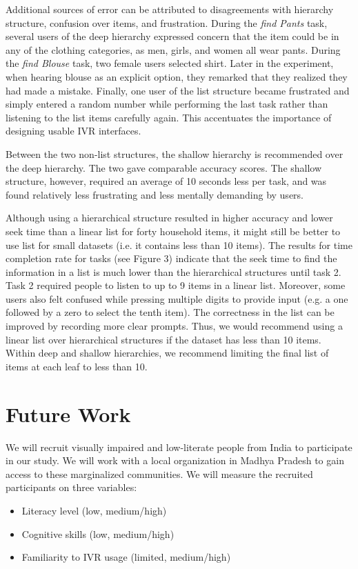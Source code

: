 \documentclass{sigchi}
\begin{document}
Additional sources of error can be attributed to disagreements with hierarchy structure, confusion over items, and frustration. During the \textit{find Pants} task, several users of the deep hierarchy expressed concern that the item could be in any of the clothing categories, as men, girls, and women all wear pants. During the \textit{find Blouse} task, two female users selected shirt. Later in the experiment, when hearing blouse as an explicit option, they remarked that they realized they had made a mistake. Finally, one user of the list structure became frustrated and simply entered a random number while performing the last task rather than listening to the list items carefully again. This accentuates the importance of designing usable IVR interfaces. 

Between the two non-list structures, the shallow hierarchy is recommended over the deep hierarchy. The two gave comparable accuracy scores. The shallow structure, however, required an average of 10 seconds less per task, and was found relatively less frustrating and less mentally demanding by users.

Although using a hierarchical structure resulted in higher accuracy and lower seek time than a linear list for forty household items, it might still be better to use list for small datasets (i.e. it contains less than 10 items). The results for time completion rate for tasks (see Figure 3) indicate that the seek time to find the information in a list is much lower than the hierarchical structures until task 2. Task 2 required people to listen to up to 9 items in a linear list.  Moreover, some users also felt confused while pressing multiple digits to provide input (e.g. a one followed by a zero to select the tenth item). The correctness in the list can be improved by recording more clear prompts. Thus, we would recommend using a linear list over hierarchical structures if the dataset has less than 10 items. Within deep and shallow hierarchies, we recommend limiting the final list of items at each leaf to less than 10.


\section{Future Work}
We will recruit visually impaired and low-literate people from India to participate in our study. We will work with a local organization in Madhya Pradesh to gain access to these marginalized communities. We will measure the recruited participants on three variables:
\begin{itemize}
\item Literacy level (low, medium/high)
\item Cognitive skills (low, medium/high)
\item Familiarity to IVR usage (limited, medium/high)
\end{itemize}
\end{document}
